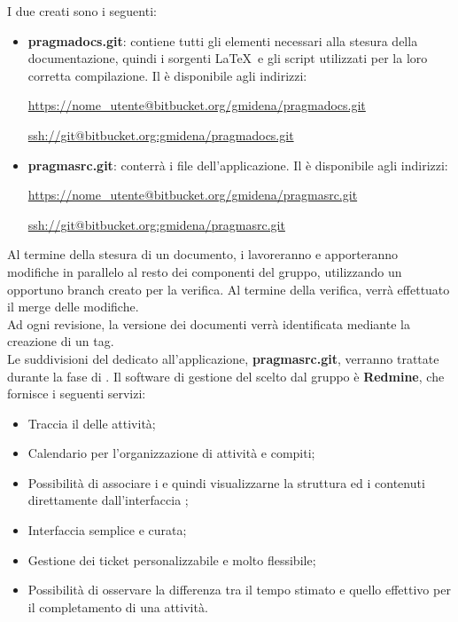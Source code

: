 I due  creati sono i seguenti:
\begin{itemize}
\item \textbf{pragmadocs.git}: contiene tutti gli elementi necessari alla stesura della documentazione, quindi i sorgenti \LaTeX  ~e gli script utilizzati per la loro corretta compilazione. Il  è disponibile agli indirizzi:
\begin{center}
\url{https://nome_utente@bitbucket.org/gmidena/pragmadocs.git} \par
\url{ssh://git@bitbucket.org:gmidena/pragmadocs.git}
\end{center}
\item \textbf{pragmasrc.git}: conterrà i file dell'applicazione. Il  è disponibile agli indirizzi:
\begin{center}
\url{https://nome_utente@bitbucket.org/gmidena/pragmasrc.git} \par
\url{ssh://git@bitbucket.org:gmidena/pragmasrc.git}
\end{center}
\end{itemize}
Al termine della stesura di un documento, i \rVs lavoreranno e apporteranno modifiche in parallelo al resto dei componenti del gruppo, utilizzando un opportuno branch creato per la verifica. Al termine della verifica, verrà effettuato il merge delle modifiche.
\\Ad ogni revisione, la versione dei documenti verrà identificata mediante la creazione di un tag.
\\Le suddivisioni del  dedicato all'applicazione, \textbf{pragmasrc.git}, verranno trattate durante la fase di \fPA.
\label{sistemaTicketing}
Il software di gestione del  scelto dal gruppo è \textbf{Redmine}, che fornisce i seguenti servizi:
\begin{itemize}
\item Traccia il  delle attività;
\item Calendario per l'organizzazione di attività e compiti;
\item Possibilità di associare i  e quindi visualizzarne la struttura ed i contenuti direttamente dall'interfaccia ;
\item Interfaccia  semplice e curata;
\item Gestione dei ticket personalizzabile e molto flessibile;
\item Possibilità di osservare la differenza tra il tempo stimato e quello effettivo per il completamento di una attività.
\end{itemize}
